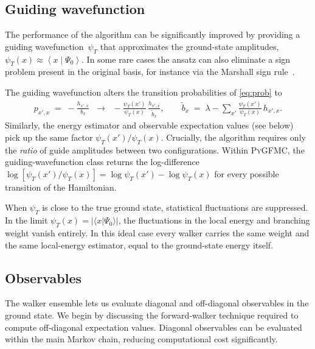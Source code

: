 \documentclass{SciPost}
\providecommand{\braket}[2]{\left\langle#1\middle|#2\right\rangle}
\providecommand{\PyGFMC}{\textsc{PyGFMC}}
\begin{document}
\subsection{Guiding wavefunction}\label{sec:gfmc:guide}
The performance of the algorithm can be significantly improved by providing a guiding wavefunction~$\psi_T$ that approximates the ground-state amplitudes, $\psi_T(x) \approx \braket{x}{\Psi_0}$.
%
In some rare cases the ansatz can also eliminate a sign problem present in the original basis, for instance via the Marshall sign rule~\cite{marshall_antiferromagnetism_1955}.


The guiding wavefunction alters the transition probabilities of \autoref{eq:prob} to
\begin{align}
	p_{x',x} \;=\; -\frac{h_{x',x}}{b_x}
	\;\;\longrightarrow\;\;
	-\frac{\psi_T(x')}{\psi_T(x)}\,\frac{h_{x',x}}{\tilde{b}_x},
	\qquad
	\tilde{b}_x \;=\; \lambda - \sum_{x'}
		\frac{\psi_T(x')}{\psi_T(x)}\,h_{x',x}.
	\label{eq:prob_guide}
\end{align}
Similarly, the energy estimator and observable expectation values (see below) pick up the same factor $\psi_T(x')/\psi_T(x)$.
%
Crucially, the algorithm requires only the \emph{ratio} of guide amplitudes between two configurations.
%
Within \PyGFMC{}, the guiding-wavefunction class returns the log-difference $\log[\psi_T(x')/\psi_T(x)] = \log\psi_T(x') -\log\psi_T(x)$ for every possible transition of the Hamiltonian.

When $\psi_T$ is close to the true ground state, statistical fluctuations are suppressed.
%
In the limit $\psi_T(x)=\vert\langle x|\Psi_0\rangle\vert$, the fluctuations in the local energy and branching weight vanish entirely.
%
In this ideal case every walker carries the same weight and the same local-energy estimator, equal to the ground-state energy itself.


\subsection{Observables}\label{sec:gfmc:obs}
The walker ensemble lets us evaluate diagonal and off-diagonal observables in the ground state.
%
We begin by discussing the forward-walker technique required to compute off-diagonal expectation values.
%
Diagonal observables can be evaluated within the main Markov chain, reducing computational cost significantly.
\end{document}
